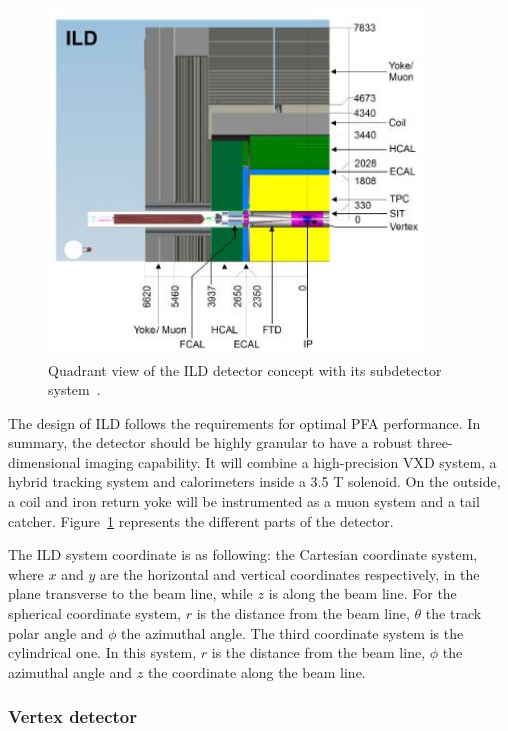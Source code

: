     \begin{figure}[!h]
      \centering
      \includegraphics[width = 10cm]{Pictures/ILC/fig_ILD_Quadrant.png}
      \caption{Quadrant view of the ILD detector concept with its subdetector system~\cite{Behnke2010}.}
      \label{fig:ILD_quadrant}
    \end{figure}

    The design of \gls{ILD} follows the requirements for optimal \gls{PFA} performance.
    In summary, the detector should be highly granular to have a robust three-dimensional imaging capability.
    It will combine a high-precision \acrfull{VXD} system, a hybrid tracking system and calorimeters inside a 3.5 T solenoid. 
    On the outside, a coil and iron return yoke will be instrumented as a muon system and a tail catcher.
    Figure~\ref{fig:ILD_quadrant} represents the different parts of the detector.

    The \gls{ILD} system coordinate is as following: the Cartesian coordinate system, where $x$ and $y$ are the horizontal and vertical coordinates respectively, in the plane transverse to the beam line, while $z$ is along the beam line.
    For the spherical coordinate system, $r$ is the distance from the beam line, $\theta$ the track polar angle and $\phi$ the azimuthal angle.
    The third coordinate system is the cylindrical one.
    In this system, $r$ is the distance from the beam line, $\phi$ the azimuthal angle and $z$ the coordinate along the beam line.

      \subsubsection{Vertex detector}

